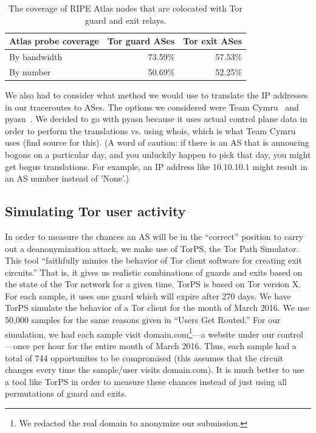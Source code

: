 
\begin{table}[t]
	\centering
	\begin{tabular}{l|r r}
	\toprule
	\textbf{Atlas probe coverage} & \textbf{Tor guard ASes} & \textbf{Tor exit ASes} \\
	\midrule
	By bandwidth & 73.59\% & 57.53\% \\
	By number & 50.69\% & 52.25\% \\
	\bottomrule
	\end{tabular}
	\caption{The coverage of RIPE Atlas nodes that are colocated with Tor guard and exit
	relays.}
	\label{tab:atlas-coverage}
\end{table}

We also had to consider what method we would use to translate the IP addresses in
our traceroutes to ASes. The options we considered were Team Cymru~\cite{ipasn}
and pyasn~\cite{pyasn}. We decided to go with pyasn because it uses actual
control plane data in order to perform the translations vs. using whois, which
is what Team Cymru uses (find source for this).  (A word of caution: if there is
an AS that is annoucing bogons on a particular day, and you unluckily happen to
pick that day, you might get bogus translations. For example, an IP address like
10.10.10.1 might result in an AS number instead of 'None'.)

\subsection{Simulating Tor user activity}
In order to measure the chances an AS will be in the ``correct'' position to carry out a
deanonymization attack, we make use of TorPS, the Tor Path Simulator. This tool 
``faithfully mimics the behavior of Tor client software for creating exit circuits.''
That is, it gives us realistic combinations of guards and exits based on the state of the 
Tor network for a given time. TorPS is based on Tor version X. For each sample, it uses 
one guard which will expire after 270 days. We have TorPS simulate the behavior of a Tor 
client for the month of March 2016. We use 50,000 samples for the same reasons given in
``Users Get Routed.''  For our simulation, we had each sample 
visit domain.com\footnote{We redacted the real domain to anonymize our
submission.}---a website under our control---once per hour for the entire month
of March 2016.  Thus, each sample had a total of 744 opportunites to be
compromised (this assumes that the circuit changes every time the sample/user
visits domain.com).  It is much better to use a tool like TorPS in order to
measure these chances instead of just using all permutations of guard and exits.

